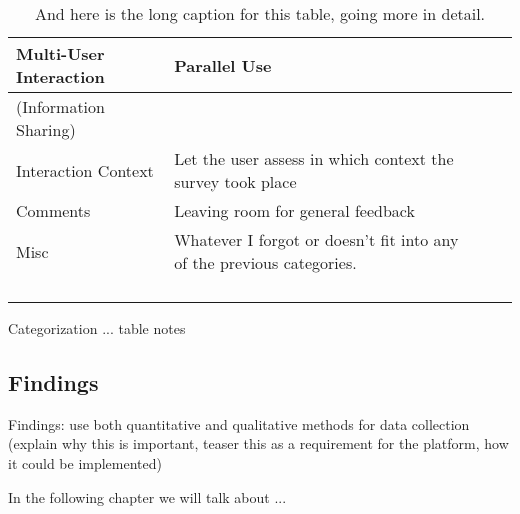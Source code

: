 \begin{table}[h]
\begin{tabular}{|p{4cm}|p{6cm}|p{3cm}|p{2cm}|}
Multi-User Interaction                & Parallel Use                                                          &                                              &                         \\ \hline
(Information Sharing)                 &                                                                       &                                              &                         \\ \hline
Interaction Context                   & Let the user assess in which context the survey took place            &                                              &                         \\ \hline
Comments                              & Leaving room for general feedback                                     &                                              &                         \\ \hline
Misc                                  & Whatever I forgot or doesn't fit into any of the previous categories. &                                              &                         \\
                                      &                                                                       &                                              &                         \\
                                      &                                                                       &                                              &                         \\
                                      &                                                                       &                                              &                         \\
                                      &                                                                       &                                              &                        
\end{tabular}
		\begin{tablenotes}
		      \small
		      \item Categorization ... table notes 
		\end{tablenotes}
		\caption[Short Caption]{And here is the long caption for this table, going more in detail.}
\end{table}		    







\subsection{Findings}

	Findings: use both quantitative and qualitative methods for data collection (explain why this is important, teaser this as a requirement for the platform, how it could be implemented)




In the following chapter we will talk about ...

